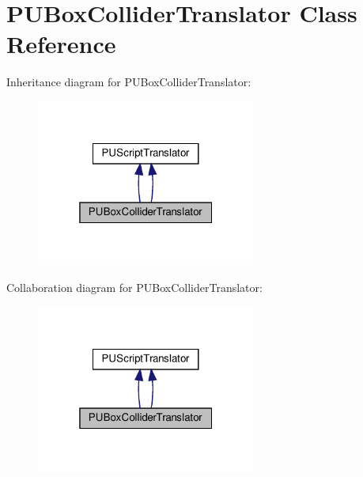 \hypertarget{classPUBoxColliderTranslator}{}\section{P\+U\+Box\+Collider\+Translator Class Reference}
\label{classPUBoxColliderTranslator}


Inheritance diagram for P\+U\+Box\+Collider\+Translator\+:
\nopagebreak
\begin{figure}[H]
\begin{center}
\leavevmode
\includegraphics[width=205pt]{classPUBoxColliderTranslator__inherit__graph}
\end{center}
\end{figure}


Collaboration diagram for P\+U\+Box\+Collider\+Translator\+:
\nopagebreak
\begin{figure}[H]
\begin{center}
\leavevmode
\includegraphics[width=205pt]{classPUBoxColliderTranslator__coll__graph}
\end{center}
\end{figure}
